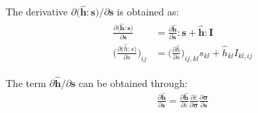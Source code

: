 \documentclass[12pt]{amsart}
\begin{document}
The derivative  $\partial\big(\hat{\mathbf{h}}:\mathbf{s}\big)/ \partial\mathbf{s}$ is obtained as:
\begin{eqnarray}
  \begin{split}
    \label{eq:dphib3}
    \frac{\partial \big(\hat{\mathbf{h}}:\mathbf{s} \big)  } {\partial{\mathbf{s}}} &= \frac{\partial{\hat{\mathbf{h}}}}{\partial{\mathbf{s}}} : \mathbf{s} +\hat{\mathbf{h}}:\mathbf{I}\\
    \bigg(\frac{\partial \big(\hat{h}:s \big)  } {\partial s}\bigg)_{ij} &= \bigg(\frac{\partial\hat{h}}{\partial s}\bigg)_{ij,kl} s_{kl} +\hat{h}_{kl}I_{kl,ij}
  \end{split}
\end{eqnarray}

The term $ \partial\hat{\mathbf{h}}/ \partial\mathbf{s} $ can be obtained through:
\begin{eqnarray}
  \label{eq:dphib4}
\frac{\partial{\hat{\mathbf{h}}}}{\partial{\mathbf{s}}}=\frac{\partial{\hat{\mathbf{h}}}}{\partial{\bar{\varepsilon}}}   \frac{\partial{\bar{\varepsilon}}}{\partial{\mathbf{\sigma}}}    \frac{\partial{\mathbf{\sigma}}}{\partial{\mathbf{s}}}
\end{eqnarray}
\end{document}

